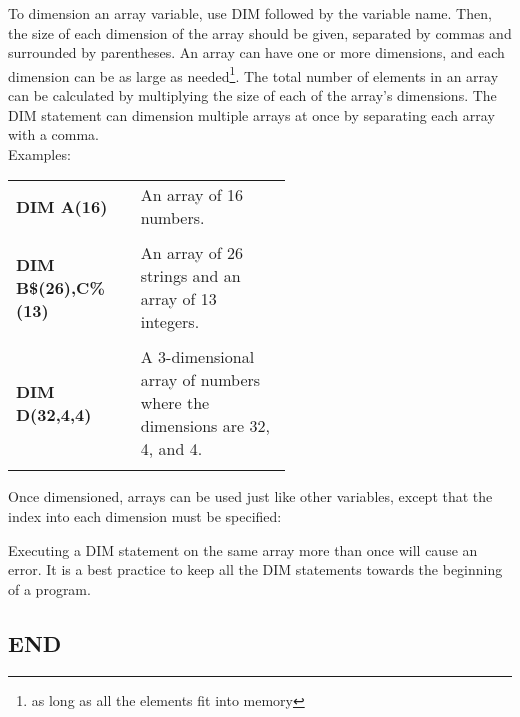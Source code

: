 To dimension an array variable, use {\ttfamily DIM} followed by the variable
name.  Then, the size of each dimension of the array should be given, separated
by commas and surrounded by parentheses.  An array can have one or more
dimensions, and each dimension can be as large as needed\footnote{as long as
all the elements fit into memory}.  The total number of elements in an array
can be calculated by multiplying the size of each of the array's dimensions.
The {\ttfamily DIM} statement can dimension multiple arrays at once by
separating each array with a comma.\\

Examples:\\

\begin{tabular}{l p{0.55\linewidth}}

	{\ttfamily\bfseries DIM A(16)}&An array of 16 numbers.\\\\

	{\ttfamily\bfseries DIM B\$(26),C\%(13)}&An array of 26 strings and an
	array of 13 integers.\\\\

	{\ttfamily\bfseries DIM D(32,4,4)}&A 3-dimensional array of numbers where
	the dimensions are 32, 4, and 4.\\\\

\end{tabular}

Once dimensioned, arrays can be used just like other variables, except that the
index into each dimension must be specified:\\


Executing a {\ttfamily DIM} statement on the same array more than once will
cause an error.  It is a best practice to keep all the {\ttfamily DIM}
statements towards the beginning of a program.\\

\subsection{END}

